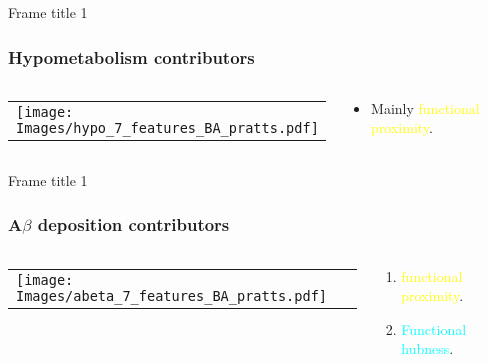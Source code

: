 \documentclass{beamer}
\begin{document}
\begin{frame}{Frame title 1}
\frametitle{Hypometabolism contributors}
  \begin{center} 
    \begin{columns}

      \begin{column}{0.7\textwidth}
        \begin{tabular}{l} 
	   \texttt{[image: Images/hypo\_7\_features\_BA\_pratts.pdf]}\\
        \end{tabular}   
      \end{column}

      \begin{column}{0.3\textwidth}
		\begin{itemize}
		\item Mainly {\textcolor{yellow}{functional proximity}}.
		\end{itemize}
      \end{column}

     \end{columns}
   \end{center}

\end{frame}
\begin{frame}{Frame title 1}
\frametitle{A$\beta$ deposition contributors}
  \begin{center} 
    \begin{columns}

      \begin{column}{0.7\textwidth}
        \begin{tabular}{l} 
	   \texttt{[image: Images/abeta\_7\_features\_BA\_pratts.pdf]}\\
        \end{tabular}   
      \end{column}

      \begin{column}{0.3\textwidth}
		\begin{enumerate}
		\item {\textcolor{yellow}{functional proximity}}.
		\item {\textcolor{cyan}{Functional hubness}}.
		\end{enumerate}
      \end{column}

     \end{columns}
   \end{center}
\end{frame}
\end{document}
